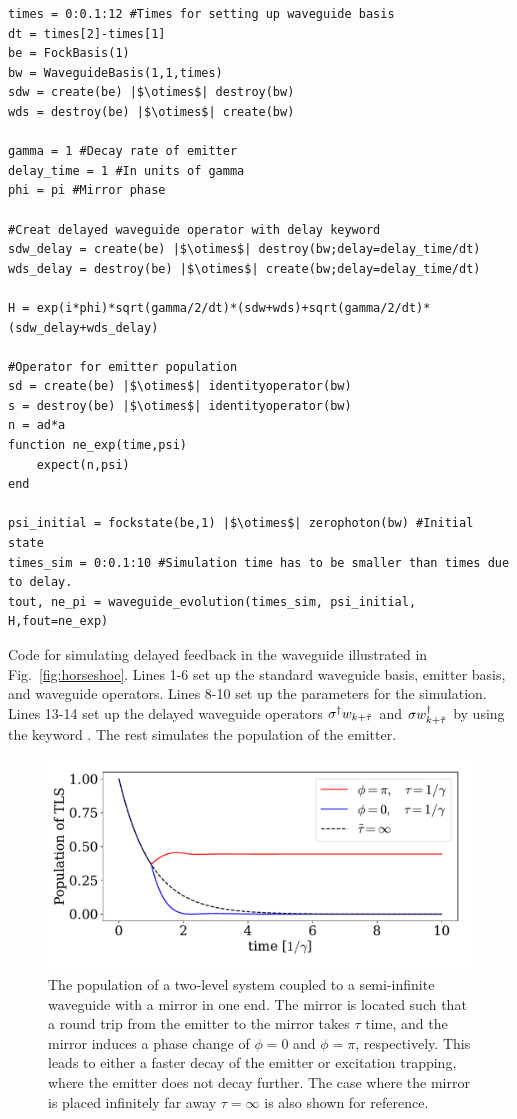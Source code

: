 \begin{listing}[H]
\begin{verbatim}
times = 0:0.1:12 #Times for setting up waveguide basis
dt = times[2]-times[1]
be = FockBasis(1)
bw = WaveguideBasis(1,1,times)
sdw = create(be) |$\otimes$| destroy(bw)
wds = destroy(be) |$\otimes$| create(bw)

gamma = 1 #Decay rate of emitter
delay_time = 1 #In units of gamma
phi = pi #Mirror phase

#Creat delayed waveguide operator with delay keyword
sdw_delay = create(be) |$\otimes$| destroy(bw;delay=delay_time/dt)
wds_delay = destroy(be) |$\otimes$| create(bw;delay=delay_time/dt)

H = exp(i*phi)*sqrt(gamma/2/dt)*(sdw+wds)+sqrt(gamma/2/dt)*(sdw_delay+wds_delay)

#Operator for emitter population
sd = create(be) |$\otimes$| identityoperator(bw)
s = destroy(be) |$\otimes$| identityoperator(bw)
n = ad*a
function ne_exp(time,psi)
    expect(n,psi)
end

psi_initial = fockstate(be,1) |$\otimes$| zerophoton(bw) #Initial state
times_sim = 0:0.1:10 #Simulation time has to be smaller than times due to delay. 
tout, ne_pi = waveguide_evolution(times_sim, psi_initial, H,fout=ne_exp)
\end{verbatim}
\caption{Code for simulating delayed feedback in the waveguide illustrated in Fig.~\ref{fig:horseshoe}. Lines 1-6 set up the standard waveguide basis, emitter basis, and waveguide operators. Lines 8-10 set up the parameters for the simulation. Lines 13-14 set up the delayed waveguide operators $\sigma^\dagger w_{k+\Tilde{\tau}}$ and $\sigma w^\dagger_{k+\Tilde{\tau}}$ by using the keyword . The rest simulates the population of the emitter.}
\label{ls:time_delay_code}
\end{listing}


\begin{figure}[H]
    \centering
    \includegraphics[width = 0.5\linewidth]{figures/tls_mirror_pop.pdf}
    \caption{The population of a two-level system coupled to a semi-infinite waveguide with a mirror in one end. The mirror is located such that a round trip from the emitter to the mirror takes $\tau$ time, and the mirror induces a phase change of $\phi = 0$ and $\phi = \pi$, respectively. This leads to either a faster decay of the emitter or excitation trapping, where the emitter does not decay further. The case where the mirror is placed infinitely far away $\tau = \infty$ is also shown for reference.}
    \label{fig:tls_feedback}
\end{figure}

